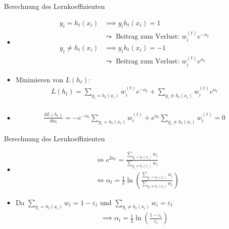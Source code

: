 \documentclass[hyperref={bookmarks=false},11pt,dvipsnames]{beamer}
\begin{document}
\begin{frame}[t]{Berechnung des Lernkoeffizienten}
	\begin{itemize}
		\item <1-> [] \begin{align*}
			      y_i = h_t(x_i)    & \implies y_ih_t(x_i)  = 1                                     \\
			                        & \leadsto \text{ Beitrag zum Verlust: } w_i^{(t)}e^{-\alpha_t} \\
			      y_i \neq h_t(x_i) & \implies y_ih_t(x_i)  = -1                                    \\
			                        & \leadsto \text{ Beitrag zum Verlust: } w_i^{(t)}e^{\alpha_t}
		      \end{align*}
		\item <2-> Minimieren von $L(h_t)$:\begin{align*}
			      L(h_t) = \sum_{y_i=h_t(x_i)}w_i^{(t)}e^{-\alpha_t} + \sum_{y_i\neq h_t(x_i)} w_i^{(t)}e^{\alpha_t} \\
		      \end{align*}
		\item<3->[] \begin{align*}
			      \frac{dL(h_t)}{d\alpha_t} = -e^{-\alpha_t}\sum_{y_i=h_t(x_i)}w_i^{(t)} + e^{\alpha_t}\sum_{y_i\neq h_t(x_i)}w_i^{(t)} = 0
		      \end{align*}
	\end{itemize}
\end{frame}

\begin{frame}[t]{Berechnung des Lernkoeffizienten}
	\begin{itemize}
		\item <1-> [] \begin{align*}
			       & \Leftrightarrow e^{2\alpha_t} = \frac{\sum_{y_i=h_t(x_i)}w_i}{\sum_{y_i\neq h_t(x_i)}w_i}                       \\
			       & \Leftrightarrow \alpha_t = \frac{1}{2}\ln\left(\frac{\sum_{y_i=h_t(x_i)}w_i}{\sum_{y_i\neq h_t(x_i)}w_i}\right)
		      \end{align*}
		\item<2-> Da $\sum_{y_i=h_t(x_i)}w_i=1-\varepsilon_t$ und $\sum_{y_i\neq h_t(x_i)}w_i=\varepsilon_t$\begin{align*}
			      \implies \alpha_t =\frac{1}{2}\ln\left(\frac{1-\varepsilon_t}{\varepsilon_t}\right)
		      \end{align*}
	\end{itemize}
\end{frame}
\end{document}

